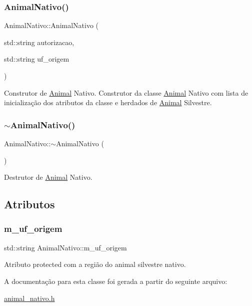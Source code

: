 \subsubsection{\texorpdfstring{Animal\+Nativo()}{AnimalNativo()}}
{\footnotesize\ttfamily Animal\+Nativo\+::\+Animal\+Nativo (\begin{DoxyParamCaption}\item[{std\+::string}]{autorizacao,  }\item[{std\+::string}]{uf\+\_\+origem }\end{DoxyParamCaption})}

Construtor de \hyperlink{classAnimal}{Animal} Nativo. Construtor da classe \hyperlink{classAnimal}{Animal} Nativo com lista de inicialização dos atributos da classe e herdados de \hyperlink{classAnimal}{Animal} Silvestre. \mbox{\label{classAnimalNativo_a365f41847e6c472b7c549f0c927929d5}} 
\subsubsection{\texorpdfstring{$\sim$\+Animal\+Nativo()}{~AnimalNativo()}}
{\footnotesize\ttfamily Animal\+Nativo\+::$\sim$\+Animal\+Nativo (\begin{DoxyParamCaption}{ }\end{DoxyParamCaption})}

Destrutor de \hyperlink{classAnimal}{Animal} Nativo. 

\subsection{Atributos}
\mbox{\label{classAnimalNativo_a5ee01fe0f43cac32ad2b729e99e036b3}} 
\subsubsection{\texorpdfstring{m\+\_\+uf\+\_\+origem}{m\_uf\_origem}}
{\footnotesize\ttfamily std\+::string Animal\+Nativo\+::m\+\_\+uf\+\_\+origem\hspace{0.3cm}{\ttfamily [protected]}}

Atributo protected com a região do animal silvestre nativo. 

A documentação para esta classe foi gerada a partir do seguinte arquivo\+:\begin{DoxyCompactItemize}
\item 
\hyperlink{animal__nativo_8h}{animal\+\_\+nativo.\+h}\end{DoxyCompactItemize}
